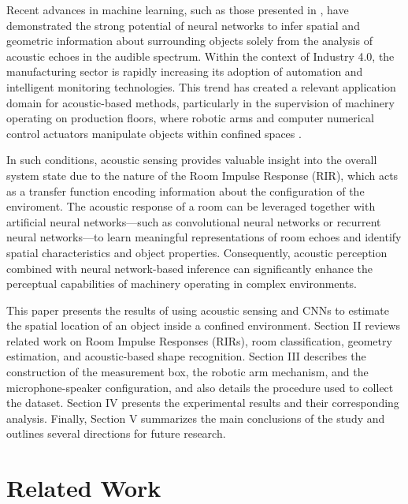 \documentclass[conference]{IEEEtran}
\begin{document}
Recent advances in machine learning, such as those presented in \cite{bat1, cat1, echosense}, have demonstrated the strong potential of neural networks to infer spatial and geometric information about surrounding objects solely from the analysis of acoustic echoes in the audible spectrum. Within the context of Industry 4.0, the manufacturing sector is rapidly increasing its adoption of automation and intelligent monitoring technologies. This trend has created a relevant application domain for acoustic-based methods, particularly in the supervision of machinery operating on production floors, where robotic arms and computer numerical control actuators manipulate objects within confined spaces \cite{mordor}.

In such conditions, acoustic sensing provides valuable insight into the overall system state due to the nature of the Room Impulse Response (RIR), which acts as a transfer function encoding information about the configuration of the enviroment. The acoustic response of a room can be leveraged together with artificial neural networks—such as convolutional neural networks or recurrent neural networks—to learn meaningful representations of room echoes and identify spatial characteristics and object properties. Consequently, acoustic perception combined with neural network-based inference can significantly enhance the perceptual capabilities of machinery operating in complex environments.

This paper presents the results of using acoustic sensing and CNNs to estimate the spatial location of an object inside a confined environment. Section II reviews related work on Room Impulse Responses (RIRs), room classification, geometry estimation, and acoustic-based shape recognition. Section III describes the construction of the measurement box, the robotic arm mechanism, and the microphone-speaker configuration, and also details the procedure used to collect the dataset. Section IV presents the experimental results and their corresponding analysis. Finally, Section V summarizes the main conclusions of the study and outlines several directions for future research.

\section{Related Work}
\end{document}
